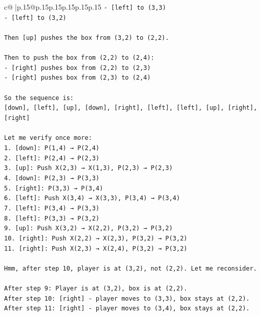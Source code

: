 \documentclass{article}
\begin{document}
{\begin{supertabular}{c@{$\;$}|p{.15\linewidth}@{}p{.15\linewidth}p{.15\linewidth}p{.15\linewidth}p{.15\linewidth}p{.15\linewidth}}
{{{\texttt{{-} {[}left{]} to (3,3)} \\
\texttt{{-} {[}left{]} to (3,2)} \\
\\ 
\texttt{Then {[}up{]} pushes the box from (3,2) to (2,2).} \\
\\ 
\texttt{Then to push the box from (2,2) to (2,4):} \\
\texttt{{-} {[}right{]} pushes box from (2,2) to (2,3)} \\
\texttt{{-} {[}right{]} pushes box from (2,3) to (2,4)} \\
\\ 
\texttt{So the sequence is:} \\
\texttt{{[}down{]}, {[}left{]}, {[}up{]}, {[}down{]}, {[}right{]}, {[}left{]}, {[}left{]}, {[}up{]}, {[}right{]}, {[}right{]}} \\
\\ 
\texttt{Let me verify once more:} \\
\texttt{1. {[}down{]}: P(1,4) → P(2,4)} \\
\texttt{2. {[}left{]}: P(2,4) → P(2,3)} \\
\texttt{3. {[}up{]}: Push X(2,3) → X(1,3), P(2,3) → P(2,3)} \\
\texttt{4. {[}down{]}: P(2,3) → P(3,3)} \\
\texttt{5. {[}right{]}: P(3,3) → P(3,4)} \\
\texttt{6. {[}left{]}: Push X(3,4) → X(3,3), P(3,4) → P(3,4)} \\
\texttt{7. {[}left{]}: P(3,4) → P(3,3)} \\
\texttt{8. {[}left{]}: P(3,3) → P(3,2)} \\
\texttt{9. {[}up{]}: Push X(3,2) → X(2,2), P(3,2) → P(3,2)} \\
\texttt{10. {[}right{]}: Push X(2,2) → X(2,3), P(3,2) → P(3,2)} \\
\texttt{11. {[}right{]}: Push X(2,3) → X(2,4), P(3,2) → P(3,2)} \\
\\ 
\texttt{Hmm, after step 10, player is at (3,2), not (2,2). Let me reconsider.} \\
\\ 
\texttt{After step 9: Player is at (3,2), box is at (2,2).} \\
\texttt{After step 10: {[}right{]} {-} player moves to (3,3), box stays at (2,2).} \\
\texttt{After step 11: {[}right{]} {-} player moves to (3,4), box stays at (2,2).} \\
}}}
\end{supertabular}}
\end{document}
